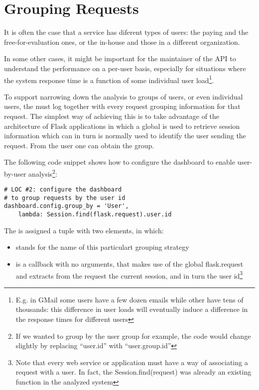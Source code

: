
\section{Grouping Requests}
\label{sec:user}

It is often the case that a service has diferent types of users: the paying and the free-for-evaluation ones, or the in-house and those in a different organization. 

In some other cases, it might be important for the maintainer of the API to understand the performance on a per-user basis, especially for situations where the system response time is a function of some individual user load\footnote{E.g. in GMail some users have a few dozen emails while other have tens of thousands: this difference in user loads will eventually induce a difference in the response times for different users}.

To support narrowing down the analysis to groups of users, or even individual users, the \tool must log together with every request grouping information for that request. The simplest way of achieving this is to take advantage of the architecture of Flask applications in which a global  is used to retrieve session information which can in turn is normally used to identify the user sending the request. From the user one can obtain the group. 

The following code snippet shows how to configure the dashboard to enable user-by-user analysis\footnote{	If we wanted to group by the user group for example, the code would change slightly by replacing ``user.id'' with ``user.group.id''}: 

\begin{lstlisting}[style=custompython]  
# LOC #2: configure the dashboard
# to group requests by the user id
dashboard.config.group_by = 'User',
	lambda: Session.find(flask.request).user.id

\end{lstlisting}

The  is assigned a tuple with two elements, in which:  

\begin{itemize}
	\item {} stands for the name of this particulart grouping strategy
	\item {} is a callback with no arguments, 
	that makes use of the global flask.request and extracts from 
	the request the current session, and in turn the user id\footnote{
		Note that every web service or application must have a way of 
		associating a request with a user. In fact, the Session.find(request) 
		was already an existing function in the analyzed system}
\end{itemize}

